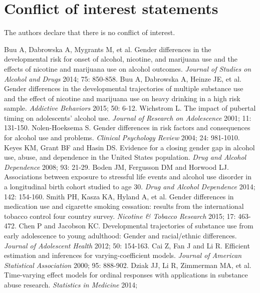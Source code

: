 \section*{Conflict of interest statements}
The authors declare that there is no conflict of interest.

\begin{thebibliography}
      Buu A, Dabrowska A, Mygrants M, et al. Gender differences in
the developmental risk for onset of alcohol, nicotine, and
marijuana use and the effects of nicotine and marijuana use on
alcohol outcomes. \textit{Journal of Studies on Alcohol and Drugs}
2014; 75: 850-858.
      Buu A, Dabrowska A, Heinze JE, et al. Gender differences in the developmental
trajectories of multiple substance use and the effect of nicotine
and marijuana use on heavy drinking in a high risk sample.
\textit{Addictive Behaviors} 2015; 50: 6-12.
      Wichstrom L. The impact of pubertal
timing on adolescents' alcohol use. \textit{Journal of Research on
Adolescence} 2001; 11: 131-150.
      Nolen-Hoeksema S. Gender differences in
     risk factors and consequences for alcohol use and problems. \textit{Clinical Psychology Review} 2004; 24: 981-1010.
      Keyes KM, Grant BF and Hasin DS. Evidence for a closing gender
     gap in alcohol use, abuse, and dependence in the United States population. \textit{Drug and Alcohol Dependence} 2008; 93: 21-29.
       Boden JM, Fergusson DM and Horwood LJ. Associations between exposure to stressful life events and alcohol use disorder
      in a longitudinal birth cohort studied to age 30. \textit{Drug and Alcohol Dependence} 2014; 142: 154-160.
        Smith PH, Kasza KA, Hyland A, et al. Gender differences in medication use and cigarette smoking cessation:
       results from the international tobacco control four country survey. \textit{Nicotine & Tobacco Research} 2015; 17: 463-472.
      Chen P and Jacobson KC. Developmental trajectories
     of substance use from early adolescence to young adulthood: Gender and racial/ethnic differences. \textit{Journal of Adolescent Health} 2012; 50: 154-163.
      Cai Z, Fan J and Li R. Efficient estimation
     and inferences for varying-coefficient models. \textit{Journal of American Statistical Association} 2000; 95: 888-902.
      Dziak JJ, Li R, Zimmerman MA, et al. Time-varying effect models for ordinal responses with applications
in substance abuse research. \textit{Statistics in Medicine} 2014;

\end{thebibliography}
